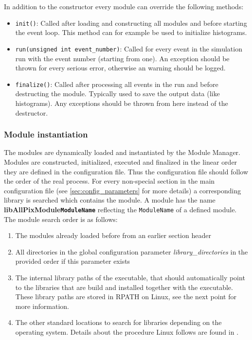 In addition to the constructor every module can override the following methods:
\begin{itemize}
\item \texttt{init()}: Called after loading and constructing all modules and before starting the event loop. This method can for example be used to initialize histograms.
\item \texttt{run(unsigned int event\_number)}: Called for every event in the simulation run with the event number (starting from one). An exception should be thrown for every serious error, otherwise an warning should be logged.
\item \texttt{finalize()}: Called after processing all events in the run and before destructing the module. Typically used to save the output data (like histograms). Any exceptions should be thrown from here instead of the destructor.
\end{itemize}

\subsubsection{Module instantiation}
\label{sec:module_instantiation}
The modules are dynamically loaded and instantiated by the Module Manager. Modules are constructed, initialized, executed and finalized in the linear order they are defined in the configuration file. Thus the configuration file should follow the order of the real process. For every non-special section in the main configuration file (see \ref{sec:config_parameters} for more details) a corresponding library is searched which contains the module. A module has the name \textbf{libAllPixModule\texttt{ModuleName}} reflecting the \texttt{ModuleName} of a defined module. The module search order is as follows:
\begin{enumerate}
\item The modules already loaded before from an earlier section header
\item All directories in the global configuration parameter \textit{library\_directories} in the provided order if this parameter exists
\item The internal library paths of the executable, that should automatically point to the libraries that are build and installed together with the executable. These library paths are stored in RPATH on Linux, see the next point for more information.
\item The other standard locations to search for libraries depending on the operating system. Details about the procedure Linux follows are found in \cite{linuxld}.
\end{enumerate}


